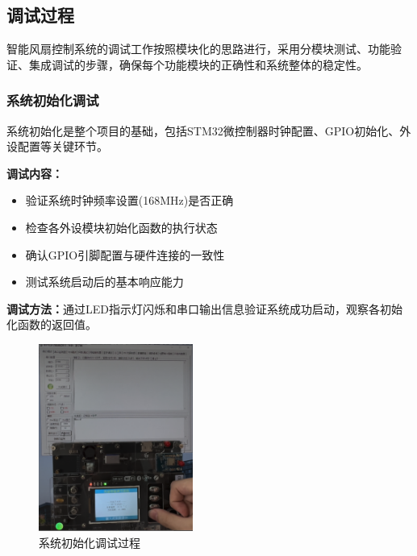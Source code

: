 \subsection{调试过程}

\qquad 智能风扇控制系统的调试工作按照模块化的思路进行，采用分模块测试、功能验证、集成调试的步骤，确保每个功能模块的正确性和系统整体的稳定性。

\subsubsection{系统初始化调试}

\qquad 系统初始化是整个项目的基础，包括STM32微控制器时钟配置、GPIO初始化、外设配置等关键环节。

\textbf{调试内容：}
\begin{itemize}
    \vspace{-6pt}
  \item 验证系统时钟频率设置(168MHz)是否正确
    \vspace{-6pt}
  \item 检查各外设模块初始化函数的执行状态
    \vspace{-6pt}
  \item 确认GPIO引脚配置与硬件连接的一致性
    \vspace{-6pt}
  \item 测试系统启动后的基本响应能力
\end{itemize}

\textbf{调试方法：}通过LED指示灯闪烁和串口输出信息验证系统成功启动，观察各初始化函数的返回值。

\begin{figure}[H]
  \centering
  \includegraphics[width=0.45\textwidth]{../figures/CleanShot 2025-06-11 at 11.48.35@2x.png}
  \caption{系统初始化调试过程}
  \label{fig:system_init_debug}
\end{figure}

